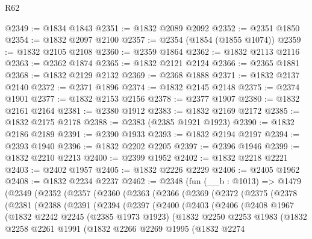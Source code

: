 \begin{lexlean}{R62}
\begin{coremodule}
@2349 := @1834 @1843
@2351 := @1832 @2089 @2092
@2352 := @2351 @1850
@2354 := @1832 @2097 @2100
@2357 := @2354 (@1854 (@1855 @1074))
@2359 := @1832 @2105 @2108
@2360 := @2359 @1864
@2362 := @1832 @2113 @2116
@2363 := @2362 @1874
@2365 := @1832 @2121 @2124
@2366 := @2365 @1881
@2368 := @1832 @2129 @2132
@2369 := @2368 @1888
@2371 := @1832 @2137 @2140
@2372 := @2371 @1896
@2374 := @1832 @2145 @2148
@2375 := @2374 @1901
@2377 := @1832 @2153 @2156
@2378 := @2377 @1907
@2380 := @1832 @2161 @2164
@2381 := @2380 @1912
@2383 := @1832 @2169 @2172
@2385 := @1832 @2175 @2178
@2388 := @2383 (@2385 @1921 @1923)
@2390 := @1832 @2186 @2189
@2391 := @2390 @1933
@2393 := @1832 @2194 @2197
@2394 := @2393 @1940
@2396 := @1832 @2202 @2205
@2397 := @2396 @1946
@2399 := @1832 @2210 @2213
@2400 := @2399 @1952
@2402 := @1832 @2218 @2221
@2403 := @2402 @1957
@2405 := @1832 @2226 @2229
@2406 := @2405 @1962
@2408 := @1832 @2234 @2237
@2462 := @2348
    (fun (__b : @1013) =>
    @1479
      (@2349
        (@2352
          (@2357
            (@2360
              (@2363
                (@2366
                  (@2369
                    (@2372
                      (@2375
                        (@2378
                          (@2381
                            (@2388
                              (@2391
                                (@2394
                                  (@2397
                                    (@2400
                                      (@2403
                                        (@2406
                                          (@2408
                                            @1967
                                            (@1832
                                              @2242
                                              @2245
                                              (@2385 @1973 @1923)
                                              (@1832
                                                @2250
                                                @2253
                                                @1983
                                                (@1832
                                                  @2258
                                                  @2261
                                                  @1991
                                                  (@1832
                                                    @2266
                                                    @2269
                                                    @1995
                                                    (@1832
                                                      @2274

\end{coremodule}
\end{lexlean}
